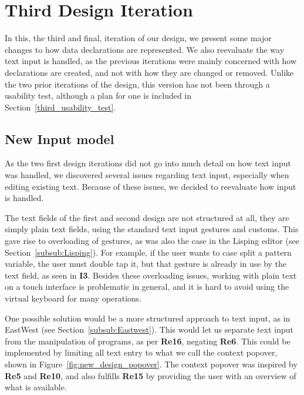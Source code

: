 \section{Third Design Iteration}
In this, the third and final, iteration of our design, we present some major changes to how data declarations are represented.
We also reevaluate the way text input is handled, as the previous iterations were mainly concerned with how declarations are created, and not with how they are changed or removed.
Unlike the two prior iterations of the design, this version has not been through a usability test, although a plan for one is included in Section~\ref{third_usability_test}.

\subsection{New Input model}
\label{subsec:new_input_model}
As the two first design iterations did not go into much detail on how text input was handled, we discovered several issues regarding text input, especially when editing existing text.
Because of these issues, we decided to reevaluate how input is handled.

The text fields of the first and second design are not structured at all, they are simply plain text fields, using the standard text input gestures and customs.
This gave rise to overloading of gestures, as was also the case in the Lisping editor (see Section~\ref{subsub:Lisping}).
For example, if the user wants to case split a pattern variable, the user must double tap it, but that gesture is already in use by the text field, as seen in \textbf{I3}.
Besides these overloading issues, working with plain text on a touch interface is problematic in general, and it is hard to avoid using the virtual keyboard for many operations.

One possible solution would be a more structured approach to text input, as in EastWest (see Section~\ref{subsub:Eastwest}).
This would let us separate text input from the manipulation of programs, as per \textbf{Re16}, negating \textbf{Re6}.
This could be implemented by limiting all text entry to what we call the context popover, shown in Figure~\ref{fig:new_design_popover}.
The context popover was inspired by \textbf{Re5} and \textbf{Re10}, and also fulfills \textbf{Re15} by providing the user with an overview of what is available.

